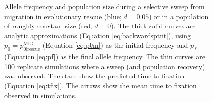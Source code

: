 \documentclass[]{article}
\begin{document}
\begin{figure}[htbp]
\caption{
Allele frequency and population size during a selective sweep from migration in evolutionary rescue (blue; $d=0.05$) or in a population of roughly constant size (red; $d=0$).
The thick solid curves are analytic approximations (Equation \ref{eq:backwardsptnt}), using $p_0 = p_{0|\mathrm{rescue}}^\mathrm{MIG}$ (Equation \ref{eq:p0m}) as the initial frequency and $p_f$ (Equation \ref{eq:pf}) as the final allele frequency.
The thin curves are 100 replicate simulations where a sweep (and population recovery) was observed.
The stars show the predicted time to fixation (Equation \ref{eq:tfix}).
The arrows show the mean time to fixation observed in simulations. 
}%
\label{fig:rescueMIG_dynamics}
\end{figure}
\end{document}
